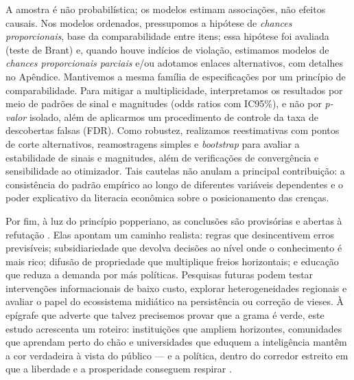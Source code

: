 A amostra é não probabilística; os modelos estimam associações, não efeitos causais. Nos modelos ordenados, pressupomos a hipótese de \textit{chances proporcionais}, base da comparabilidade entre itens; essa hipótese foi avaliada (teste de Brant) e, quando houve indícios de violação, estimamos modelos de \textit{chances proporcionais parciais} e/ou adotamos enlaces alternativos, com detalhes no Apêndice. Mantivemos a mesma família de especificações por um princípio de comparabilidade. Para mitigar a multiplicidade, interpretamos os resultados por meio de padrões de sinal e magnitudes (odds ratios com IC95\%), e não por \textit{p-valor} isolado, além de aplicarmos um procedimento de controle da taxa de descobertas falsas (FDR). Como robustez, realizamos reestimativas com pontos de corte alternativos, reamostragens simples e \textit{bootstrap} para avaliar a estabilidade de sinais e magnitudes, além de verificações de convergência e sensibilidade ao otimizador. Tais cautelas não anulam a principal contribuição: a consistência do padrão empírico ao longo de diferentes variáveis dependentes e o poder explicativo da literacia econômica sobre o posicionamento das crenças.

Por fim, à luz do princípio popperiano, as conclusões são provisórias e abertas à refutação \cite{popperlogic}. Elas apontam um caminho realista: regras que desincentivem erros previsíveis; subsidiariedade que devolva decisões ao nível onde o conhecimento é mais rico; difusão de propriedade que multiplique freios horizontais; e educação que reduza a demanda por más políticas. Pesquisas futuras podem testar intervenções informacionais de baixo custo, explorar heterogeneidades regionais e avaliar o papel do ecossistema midiático na persistência ou correção de vieses. À epígrafe que adverte que talvez precisemos provar que a grama é verde, este estudo acrescenta um roteiro: instituições que ampliem horizontes, comunidades que aprendam perto do chão e universidades que eduquem a inteligência mantêm a cor verdadeira à vista do público — e a política, dentro do corredor estreito em que a liberdade e a prosperidade conseguem respirar \cite{acemoglu2019narrow,Acemoglu2019}.
